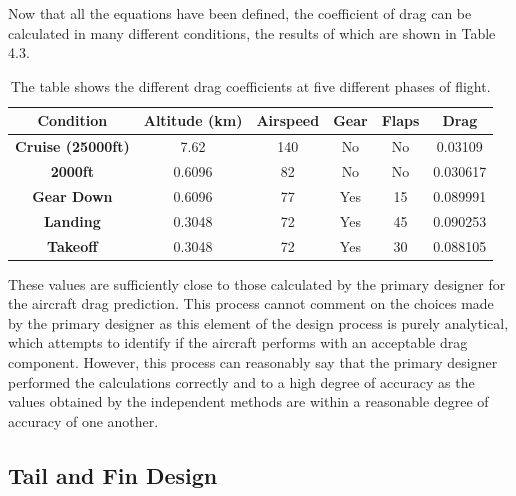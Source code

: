 \documentclass[stu, a4paper, 12pt, floatsintext]{apa7}
\numberwithin{figure}{section}
\numberwithin{table}{section}
\numberwithin{equation}{section}
\begin{document}
Now that all the equations have been defined, the coefficient of drag can be calculated in many different conditions, the results of which are shown in Table 4.3. 

\begin{table}[]
    \centering
    \caption{The table shows the different drag coefficients at five different phases of flight.}
    \label{tab:drag_values}
    \begin{tabular}{@{}cccccc@{}}
    \toprule 
    \textbf{Condition}        & \textbf{Altitude (km)} & \textbf{Airspeed} & \textbf{Gear} & \textbf{Flaps} & \textbf{Drag} \\ \midrule
    \textbf{Cruise (25000ft)} & 7.62                   & 140               & No            & No             & 0.03109       \\ 
    \textbf{2000ft}           & 0.6096                 & 82                & No            & No             & 0.030617      \\
    \textbf{Gear Down}        & 0.6096                 & 77                & Yes           & 15             & 0.089991      \\
    \textbf{Landing}          & 0.3048                 & 72                & Yes           & 45             & 0.090253      \\ 
    \textbf{Takeoff}          & 0.3048                 & 72                & Yes           & 30             & 0.088105      \\ \bottomrule
    \end{tabular}
\end{table}

These values are sufficiently close to those calculated by the primary designer for the aircraft drag prediction. This process cannot comment on the choices made by the primary designer as this element of the design process is purely analytical, which attempts to identify if the aircraft performs with an acceptable drag component. However, this process can reasonably say that the primary designer performed the calculations correctly and to a high degree of accuracy as the values obtained by the independent methods are within a reasonable degree of accuracy of one another.   
\subsection{Tail and Fin Design}
\end{document}
